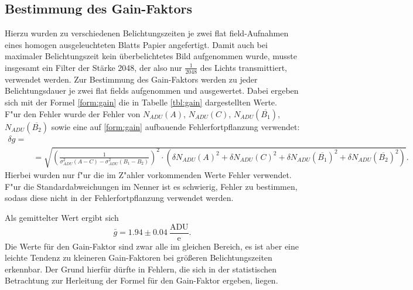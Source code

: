 \subsection{Bestimmung des Gain-Faktors}
Hierzu wurden zu verschiedenen Belichtungszeiten je zwei flat field-Aufnahmen eines homogen ausgeleuchteten Blatts Papier angefertigt.
Damit auch bei maximaler Belichtungszeit kein überbelichtetes Bild aufgenommen wurde, musste insgesamt ein Filter der Stärke 2048, der also nur $\frac{1}{2048}$ des Lichts transmittiert, verwendet werden. 
Zur Bestimmung des Gain-Faktors werden zu jeder Belichtungsdauer je zwei flat fields aufgenommen und ausgewertet. Dabei ergeben sich mit der Formel \eqref{form:gain} die in Tabelle \ref{tbl:gain} dargestellten Werte. \\
F"ur den Fehler wurde der Fehler von $N_{ADU}(A)$, $N_{ADU}(C)$, $N_{ADU}(\overline{B_1})$, $N_{ADU}(\overline{B_2})$ sowie eine auf \eqref{form:gain} aufbauende Fehlerfortpflanzung verwendet:
\footnotesize
\begin{align}
\delta g = \nonumber\\&= \sqrt{(\frac{1}{\sigma_{ADU}^2(A-C) - \sigma_{ADU}^2(B_1-B_2)})^2 \cdot (\delta N_{ADU}(A)^2 + \delta N_{ADU}(C)^2+ \delta N_{ADU}(\overline{B_1})^2 + \delta N_{ADU}(\overline{B_2})^2)}. 
\end{align}
\normalsize
Hierbei wurden nur f"ur die im Z"ahler vorkommenden Werte Fehler verwendet. F"ur die Standardabweichungen im Nenner ist es schwierig, Fehler zu bestimmen, sodass diese nicht in der Fehlerfortpflanzung verwendet werden. 

Als gemittelter Wert ergibt sich 
\begin{equation}
\bar{g} = 1.94 \pm 0.04 \ \frac{\mathrm{ADU}}{\mathrm{e}}. 
\end{equation}
Die Werte für den Gain-Faktor sind zwar alle im gleichen Bereich, es ist aber eine leichte Tendenz zu kleineren Gain-Faktoren bei größeren Belichtungszeiten erkennbar. Der Grund hierfür dürfte in Fehlern, die sich in der statistischen Betrachtung zur Herleitung der Formel für den Gain-Faktor ergeben, liegen. 
